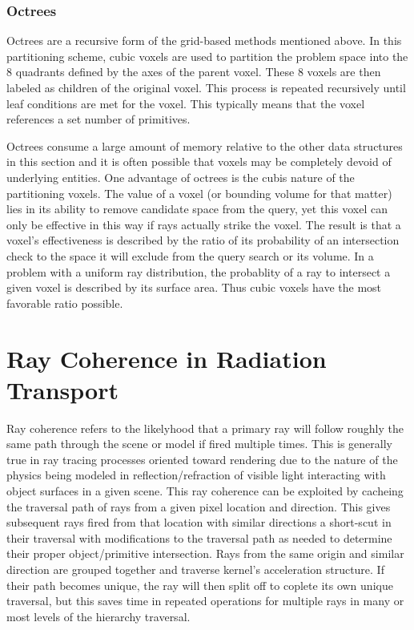 \documentclass[10pt, a4paper]{article}
\begin{document}

\subsubsection{Octrees}%

Octrees are a recursive form of the grid-based methods mentioned above. In this partitioning scheme, cubic voxels are used to partition the problem space into the 8 quadrants defined by the axes of the parent voxel. These 8 voxels are then labeled as children of the original voxel. This process is repeated recursively until leaf conditions are met for the voxel. This typically means that the voxel references a set number of primitives.

Octrees consume a large amount of memory relative to the other data structures in this section and  it is often possible that voxels may be completely devoid of underlying entities. One advantage of octrees is the cubis nature of the partitioning voxels. The value of a voxel (or bounding volume for that matter) lies in its ability to remove candidate space from the query, yet this voxel can only be effective in this way if rays actually strike the voxel. The result is that a voxel's effectiveness is described by the ratio of its probability of an intersection check to the space it will exclude from the query search or its volume. In a problem with a uniform ray distribution, the probablity of a ray to intersect a given voxel is described by its surface area. Thus cubic voxels have the most favorable ratio possible.

\section{Ray Coherence in Radiation Transport}%

Ray coherence refers to the likelyhood that a primary ray will follow roughly the same path through the scene or model if fired multiple times. This is generally true in ray tracing processes oriented toward rendering due to the nature of the physics being modeled in reflection/refraction of visible light interacting with object surfaces in a given scene. This ray coherence can be exploited by cacheing the traversal path of rays from a given pixel location and direction. This gives subsequent rays fired from that location with similar directions a short-scut in their traversal with modifications to the traversal path as needed to determine their proper object/primitive intersection. Rays from the same origin and similar direction are grouped together and traverse kernel's acceleration structure. If their path becomes unique, the ray will then split off to coplete its own unique traversal, but this saves time in repeated operations for multiple rays in many or most levels of the hierarchy traversal.
\end{document}

